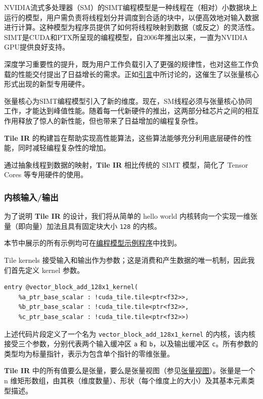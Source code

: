 \documentclass{article}
\begin{document}
NVIDIA流式多处理器（SM）的SIMT编程模型是一种线程在（相对）小数据块上运行的模型，用户需负责将线程划分并调度到合适的块中，以便高效地对输入数据进行计算。这种模型为程序员提供了如何将线程映射到数据（或反之）的灵活性。SIMT是CUDA和PTX所呈现的编程模型，自2006年推出以来，一直为NVIDIA GPU提供良好支持。


深度学习重要性的提升，既为用户工作负载引入了更强的规律性，也对这些工作负载的性能交付提出了日益增长的需求。正如\href{https://docs.nvidia.com/cuda/tile-ir/latest/sections/introduction.html#section-introduction}{引言}中所讨论的，这催生了以张量核心形式出现的新型专用硬件。


张量核心为SIMT编程模型引入了新的维度。现在，SM线程必须与张量核心协同工作，才能达到峰值性能。随着每一代新硬件的推出，这两部分硅芯片之间的相互作用释放了惊人的新性能，但也带来了日益增加的编程复杂性。


\textbf{Tile IR} 的构建旨在帮助实现高性能算法，这些算法能够充分利用底层硬件的性能，同时减轻编程复杂性的增加。


通过抽象线程到数据的映射，\textbf{Tile IR} 相比传统的 SIMT 模型，简化了 Tensor Cores 等专用硬件的使用。



\subsubsection{内核输入/输出}

为了说明 \textbf{Tile IR} 的设计，我们将从简单的 hello world 内核转向一个实现一维张量（即向量）加法且具有固定块大小 \texttt{128} 的内核。

本节中展示的所有示例均可在\href{https://docs.nvidia.com/cuda/tile-ir/latest/sections/appendix.html#section-appendix-sub-prog}{编程模型示例程序}中找到。


Tile kernels 接受输入和输出作为参数；这是消费和产生数据的唯一机制，因此我们首先定义 kernel 参数。


\begin{lstlisting}
entry @vector_block_add_128x1_kernel(
    %a_ptr_base_scalar : !cuda_tile.tile<ptr<f32>>,
    %b_ptr_base_scalar : !cuda_tile.tile<ptr<f32>>,
    %c_ptr_base_scalar : !cuda_tile.tile<ptr<f32>>)
\end{lstlisting}

上述代码片段定义了一个名为 \texttt{vector\_block\_add\_128x1\_kernel} 的内核，该内核接受三个参数，分别代表两个输入缓冲区 \texttt{a} 和 \texttt{b}，以及输出缓冲区 \texttt{c}。所有参数的类型均为标量指针，表示为包含单个指针的零维张量。


\textbf{Tile IR} 中的所有值要么是张量，要么是张量视图（参见\href{https://docs.nvidia.com/cuda/tile-ir/latest/sections/types.html#type-views}{张量视图}）。张量是一个 n 维矩形数组，由其秩（维度数量）、形状（每个维度上的大小）及其基本元素类型描述。
\end{document}
